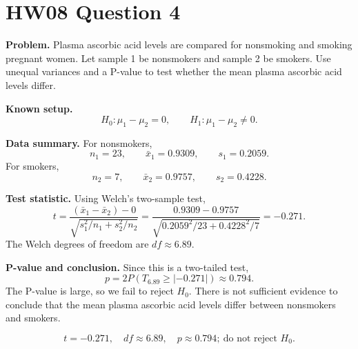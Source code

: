 \documentclass[11pt]{article}
\begin{document}
\section*{HW08 Question 4}

\textbf{Problem.} Plasma ascorbic acid levels are compared for nonsmoking and smoking pregnant women. Let sample 1 be nonsmokers and sample 2 be smokers. Use unequal variances and a P-value to test whether the mean plasma ascorbic acid levels differ.

\textbf{Known setup.}
\[
H_0:\mu_1-\mu_2=0,\qquad H_1:\mu_1-\mu_2\ne0.
\]

\textbf{Data summary.} For nonsmokers,
\[
n_1=23,\qquad \bar{x}_1=0.9309,\qquad s_1=0.2059.
\]
For smokers,
\[
n_2=7,\qquad \bar{x}_2=0.9757,\qquad s_2=0.4228.
\]

\textbf{Test statistic.} Using Welch's two-sample test,
\[
t=\frac{(\bar{x}_1-\bar{x}_2)-0}{\sqrt{s_1^2/n_1+s_2^2/n_2}}
  =\frac{0.9309-0.9757}{\sqrt{0.2059^2/23+0.4228^2/7}}
  =-0.271.
\]
The Welch degrees of freedom are \(df\approx6.89\).

\textbf{P-value and conclusion.} Since this is a two-tailed test,
\[
p=2P(T_{6.89}\ge |{-0.271}|)\approx0.794.
\]
The P-value is large, so we fail to reject \(H_0\). There is not sufficient evidence to conclude that the mean plasma ascorbic acid levels differ between nonsmokers and smokers.

\[
\boxed{t=-0.271,\quad df\approx6.89,\quad p\approx0.794;\ \text{do not reject }H_0.}
\]
\end{document}
